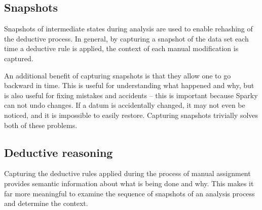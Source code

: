 \subsection*{Snapshots}
Snapshots of intermediate states during analysis are used to enable rehashing
of the deductive process.  In general, by capturing a snapshot of the data set
each time a deductive rule is applied, the context of each manual modification
is captured.

An additional benefit of capturing snapshots is that they allow one to go 
backward in time.  This is useful for understanding what happened and
why, but is also useful for fixing mistakes and accidents -- this is
important because Sparky can not undo changes.
If a datum is accidentally changed, it may not even be noticed, and it is 
impossible to easily restore.  Capturing snapshots trivially solves both
of these problems.

\subsection*{Deductive reasoning}
Capturing the deductive rules applied during the process of manual assignment
provides semantic information about what is being done and why.  This makes it
far more meaningful to examine the sequence of snapshots of an analysis
process and determine the context.

